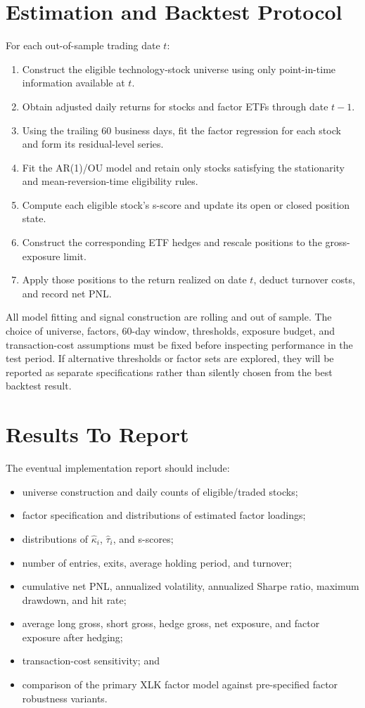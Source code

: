 \documentclass[11pt]{article}
\begin{document}
\section{Estimation and Backtest Protocol}

For each out-of-sample trading date $t$:
\begin{enumerate}
    \item Construct the eligible technology-stock universe using only
    point-in-time information available at $t$.
    \item Obtain adjusted daily returns for stocks and factor ETFs through
    date $t-1$.
    \item Using the trailing 60 business days, fit the factor regression for
    each stock and form its residual-level series.
    \item Fit the AR(1)/OU model and retain only stocks satisfying the
    stationarity and mean-reversion-time eligibility rules.
    \item Compute each eligible stock's s-score and update its open or closed
    position state.
    \item Construct the corresponding ETF hedges and rescale positions to the
    gross-exposure limit.
    \item Apply those positions to the return realized on date $t$, deduct
    turnover costs, and record net PNL.
\end{enumerate}

All model fitting and signal construction are rolling and out of sample. The
choice of universe, factors, 60-day window, thresholds, exposure budget, and
transaction-cost assumptions must be fixed before inspecting performance in
the test period. If alternative thresholds or factor sets are explored, they
will be reported as separate specifications rather than silently chosen from
the best backtest result.

\section{Results To Report}

The eventual implementation report should include:
\begin{itemize}
    \item universe construction and daily counts of eligible/traded stocks;
    \item factor specification and distributions of estimated factor loadings;
    \item distributions of $\widehat{\kappa}_i$,
    $\widehat{\tau}_i$, and s-scores;
    \item number of entries, exits, average holding period, and turnover;
    \item cumulative net PNL, annualized volatility, annualized Sharpe ratio,
    maximum drawdown, and hit rate;
    \item average long gross, short gross, hedge gross, net exposure, and
    factor exposure after hedging;
    \item transaction-cost sensitivity; and
    \item comparison of the primary XLK factor model against pre-specified
    factor robustness variants.
\end{itemize}
\end{document}
